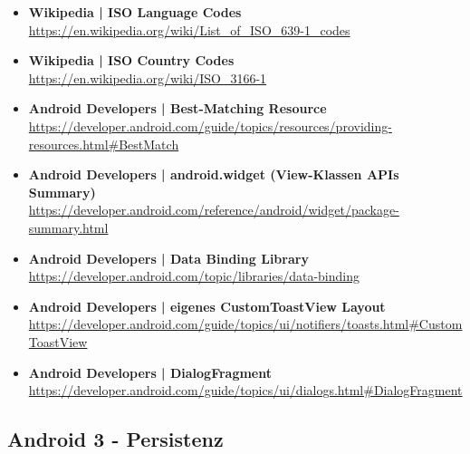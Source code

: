 \documentclass[a4paper]{article}
\begin{document}
\begin{itemize}
		\item \textbf{Wikipedia | ISO Language Codes}\\
		\href{https://en.wikipedia.org/wiki/List_of_ISO_639-1_codes}
		{https://en.wikipedia.org/wiki/List\_of\_ISO\_639-1\_codes}
		
		\item \textbf{Wikipedia | ISO Country Codes}\\
		\href{https://en.wikipedia.org/wiki/ISO_3166-1}
		{https://en.wikipedia.org/wiki/ISO\_3166-1}
		
		\item \textbf{Android Developers | Best-Matching Resource}\\
		\href{https://developer.android.com/guide/topics/resources/providing-resources.html#BestMatch}
		{https://developer.android.com/guide/topics/resources/providing-resources.html\#BestMatch}
		
		\item \textbf{Android Developers | android.widget (View-Klassen APIs Summary)}\\
		\href{https://developer.android.com/reference/android/widget/package-summary.html}
		{https://developer.android.com/reference/android/widget/package-summary.html}
		
		\item \textbf{Android Developers | Data Binding Library}\\
		\href{https://developer.android.com/topic/libraries/data-binding}
		{https://developer.android.com/topic/libraries/data-binding}
		
		\item \textbf{Android Developers | eigenes CustomToastView Layout}\\
		\href{https://developer.android.com/guide/topics/ui/notifiers/toasts.html#CustomToastView}
		{https://developer.android.com/guide/topics/ui/notifiers/toasts.html\#CustomToastView}
		
		\item \textbf{Android Developers | DialogFragment}\\
		\href{https://developer.android.com/guide/topics/ui/dialogs.html#DialogFragment}
		{https://developer.android.com/guide/topics/ui/dialogs.html\#DialogFragment}
		
		
	\end{itemize}
	
	\subsection{Android 3 - Persistenz}
	
\end{document}
